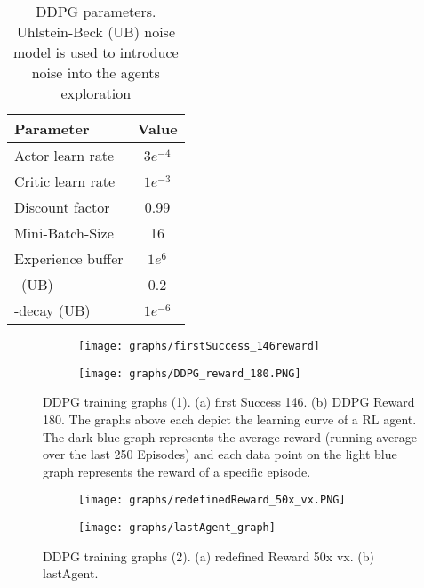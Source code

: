 {\def\arraystretch{1.4}\tabcolsep=5pt
\begin{table}
	\centering
	\begin{tabular}{| l | c |}
		\hline
		\textbf{Parameter} & \textbf{Value}\\
		\hline
		\hline
		Actor learn rate & $3e^{-4}$ \\
		Critic learn rate & $1e^{-3}$ \\
		Discount factor &  0.99 \\
		Mini-Batch-Size & 16 \\
		Experience buffer & $1e^6$\\
		\textsigma \ (UB) & 0.2 \\
		\textsigma-decay (UB) & $1e^{-6}$ \\
		
		\hline
	\end{tabular}
	\caption[DDPG parameters]{DDPG parameters. Uhlstein-Beck (UB) noise model is used to introduce noise into the agents exploration}
	\label{table: DDPG parameters}
\end{table}
}


\begin{figure}[h]
	\begin{subfigure}{\textwidth} %
		\centering
		\texttt{[image: graphs/firstSuccess\_146reward]}  %
		\caption{}
		\label{figure: RL a}
	\end{subfigure}
	\begin{subfigure}{\textwidth}
		\centering
		\texttt{[image: graphs/DDPG\_reward\_180.PNG]}  
		\caption{}
		\label{figure: RL b}
	\end{subfigure} 
		\caption[DDPG training graphs (1)]{DDPG training graphs (1). (a) first Success 146. (b) DDPG Reward 180. The graphs above each depict the learning curve of a RL agent. The dark blue graph represents the average reward (running average over the last 250 Episodes) and each data point on the light blue graph represents the reward of a specific episode.
		}
	\label{figure: DDPG learning graphs 1}
\end{figure}

\begin{figure}[h]
	\begin{subfigure}{\textwidth} %
		\centering
		\texttt{[image: graphs/redefinedReward\_50x\_vx.PNG]}  %
		\caption{}
		\label{figure: RL c}
	\end{subfigure}
	\begin{subfigure}{\textwidth}
		\centering
		\texttt{[image: graphs/lastAgent\_graph]}  
		\caption{}
		\label{figure: RL d}
	\end{subfigure} 
	\caption[DDPG training graphs (2)]{DDPG training graphs (2).  (a) redefined Reward 50x vx. (b) lastAgent.}
	\label{figure: DDPG learning graphs 2}
\end{figure}


